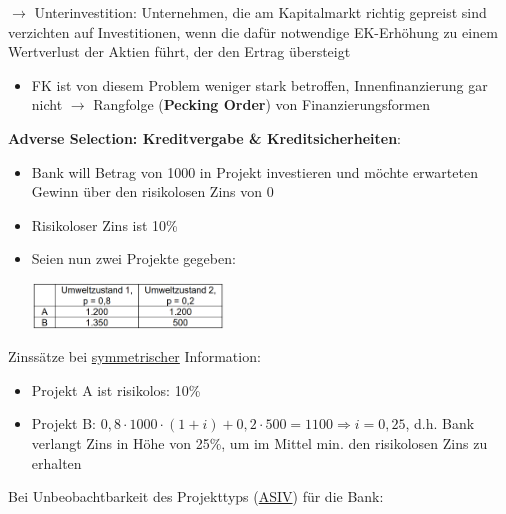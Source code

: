 $\rightarrow$ Unterinvestition: Unternehmen, die am Kapitalmarkt richtig gepreist sind verzichten auf Investitionen, wenn die dafür notwendige EK-Erhöhung zu einem Wertverlust der Aktien führt, der den Ertrag übersteigt
\begin{itemize}
	\item FK ist von diesem Problem weniger stark betroffen, Innenfinanzierung gar nicht $\rightarrow$ Rangfolge (\textbf{Pecking Order}) von Finanzierungsformen
\end{itemize}
\bigskip
\textbf{Adverse Selection: Kreditvergabe \& Kreditsicherheiten}:
\begin{itemize}
	\item Bank will Betrag von 1000 in Projekt investieren und möchte erwarteten Gewinn über den risikolosen Zins von 0
	\item Risikoloser Zins ist 10\%
	\item Seien nun zwei Projekte gegeben:
	\begin{center}
		\includegraphics[width=0.4\textwidth]{images/as-1.png}
	\end{center} 
\end{itemize}
Zinssätze bei \underline{symmetrischer} Information:
\begin{itemize}
	\item Projekt A ist risikolos: 10\%
	\item Projekt B: $0,8\cdot 1000\cdot (1+i)+0,2\cdot 500=1100 \Rightarrow i=0,25$, d.h. Bank verlangt Zins in Höhe von 25\%, um im Mittel min. den risikolosen Zins zu erhalten
\end{itemize}
Bei Unbeobachtbarkeit des Projekttyps (\underline{ASIV}) für die Bank:
